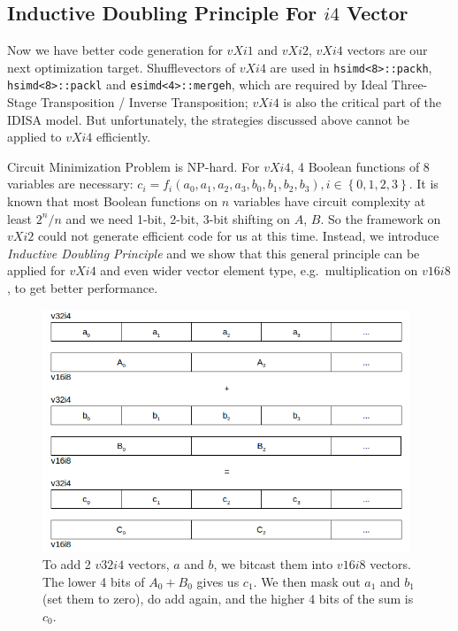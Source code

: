 \subsection{Inductive Doubling Principle For $i4$ Vector}
Now we have better code generation for $vXi1$ and $vXi2$, $vXi4$ vectors are our next optimization target. Shufflevectors of $vXi4$ are used in \verb|hsimd<8>::packh|, \verb|hsimd<8>::packl| and \verb|esimd<4>::mergeh|, which are required by Ideal Three-Stage Transposition / Inverse Transposition; $vXi4$ is also the critical part of the IDISA model. But unfortunately, the strategies discussed above cannot be applied to $vXi4$ efficiently.

Circuit Minimization Problem is NP-hard\cite{wiki_quine, kabanets2000circuit}. For $vXi4$, 4 Boolean functions of 8 variables are necessary: $c_i = f_i(a_0, a_1, a_2, a_3, b_0, b_1, b_2, b_3), i \in \left\{{0, 1, 2, 3}\right\}$. It is known that most Boolean functions on $n$ variables have circuit complexity at least $2^n/n$\cite{kabanets2000circuit} and we need 1-bit, 2-bit, 3-bit shifting on $A$, $B$. So the framework on $vXi2$ could not generate efficient code for us at this time. Instead, we introduce \textit{Inductive Doubling Principle} \cite{inductive_doubling_principle} and we show that this general principle can be applied for $vXi4$ and even wider vector element type, e.g.\ multiplication on $v16i8$, to get better performance.

\begin{figure}[ht!]
\centering
\includegraphics[width=110mm]{draw/add_4.png}
\caption[Addition of two $v32i4$ vectors.]{To add 2 $v32i4$ vectors, $a$ and $b$, we bitcast them into $v16i8$ vectors. The lower 4 bits of $A_0 + B_0$ gives us $c_1$. We then mask out $a_1$ and $b_1$ (set them to zero), do add again, and the higher 4 bits of the sum is $c_0$.}
\label{figure:add_4}
\end{figure}

